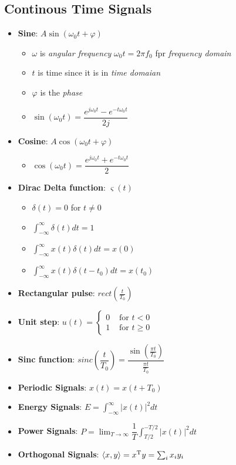 \begin{multicols}{2}
\subsection{Continous Time Signals}
\begin{itemize}
    \item \textbf{Sine}: $A\sin(\omega_0t+\varphi)$
    \begin{itemize}
        \item $\omega$ is \textit{angular frequency} $\omega_0t=2\pi f_0$ fpr \textit{frequency domain}
        \item $t$ is time since it is in \textit{time domaian}
        \item $\varphi$ is the \textit{phase}
        \item $\sin(\omega_0t)=\dfrac{e^{j\omega_0t}-e^{-t\omega_0t}}{2j}$
    \end{itemize}
    \item \textbf{Cosine}: $A\cos(\omega_0t+\varphi)$
    \begin{itemize}
        \item $\cos(\omega_0t)=\dfrac{e^{j\omega_0t}+e^{-t\omega_0t}}{2}$
    \end{itemize}
    \item \textbf{Dirac Delta function}: $\varsigma(t)$
    \begin{itemize}
        \item $\delta(t)=0$ for $t\neq 0$
        \item $\int_{-\infty}^{\infty}\delta(t)dt=1$
        \item $\int_{-\infty}^{\infty} x(t)\delta(t)dt=x(0)$
        \item $\int_{-\infty}^{\infty} x(t)\delta(t-t_0)dt=x(t_0)$
    \end{itemize}
    \item \textbf{Rectangular pulse}: $rect(\frac{t}{T_0})$
    \item \textbf{Unit step}: $u(t)=\left\{\begin{array}{ll}0 & \text { for } t<0 \\ 1 & \text { for } t \geq 0\end{array}\right.$%
    \item \textbf{Sinc function}: $sinc(\dfrac{t}{T_0})=\dfrac{\sin(\frac{\pi t}{T_0})}{\frac{\pi t}{T_0}}$
    \item \textbf{Periodic Signals}: $x(t)=x(t+T_0)$
    \item \textbf{Energy Signals}: $E=\int_{-\infty}^{\infty}|x(t)|^2dt$
    \item \textbf{Power Signals}: $P=\lim_{T\to\infty}\dfrac{1}{T}\int_{T/2}^{-T/2}|x(t)|^2dt$
    \item \textbf{Orthogonal Signals}: $\langle x,y \rangle = x^{\mathrm{T}} y = \sum_i x_i y_i$
\end{itemize}


\end{multicols}
